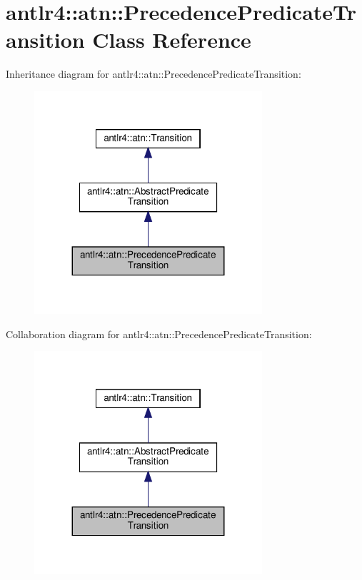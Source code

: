 \hypertarget{classantlr4_1_1atn_1_1PrecedencePredicateTransition}{}\section{antlr4\+:\+:atn\+:\+:Precedence\+Predicate\+Transition Class Reference}
\label{classantlr4_1_1atn_1_1PrecedencePredicateTransition}


Inheritance diagram for antlr4\+:\+:atn\+:\+:Precedence\+Predicate\+Transition\+:
\nopagebreak
\begin{figure}[H]
\begin{center}
\leavevmode
\includegraphics[width=239pt]{classantlr4_1_1atn_1_1PrecedencePredicateTransition__inherit__graph}
\end{center}
\end{figure}


Collaboration diagram for antlr4\+:\+:atn\+:\+:Precedence\+Predicate\+Transition\+:
\nopagebreak
\begin{figure}[H]
\begin{center}
\leavevmode
\includegraphics[width=239pt]{classantlr4_1_1atn_1_1PrecedencePredicateTransition__coll__graph}
\end{center}
\end{figure}
